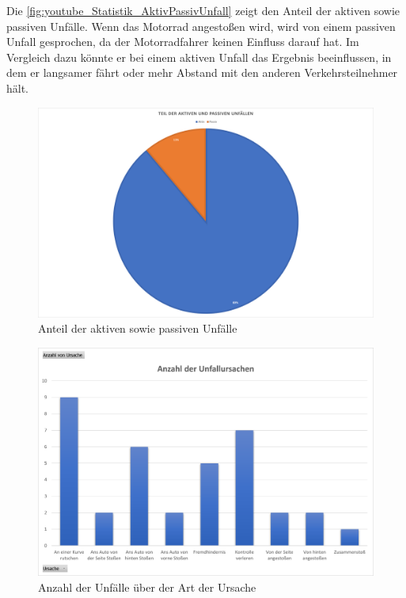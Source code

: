 Die \autoref{fig:youtube_Statistik_AktivPassivUnfall} zeigt den Anteil der aktiven sowie passiven Unfälle. Wenn das Motorrad angestoßen wird, wird von einem passiven Unfall gesprochen, da der Motorradfahrer keinen Einfluss darauf hat. Im Vergleich dazu könnte er bei einem aktiven Unfall das Ergebnis beeinflussen, in dem er langsamer fährt oder mehr Abstand mit den anderen Verkehrsteilnehmer hält.

\begin{figure}
	\centering
	\includegraphics[width=\linewidth]{Bilder/youtube_Statistik_AktivPassivUnfall.png}
	\caption{Anteil der aktiven sowie passiven Unfälle}
	\label{fig:youtube_Statistik_AktivPassivUnfall}
\end{figure}

\begin{figure}
	\centering
	\includegraphics[width=0.9\linewidth]{Bilder/youtube_Statistik_AnzahlUnfallUrsachen.png}
	\caption{Anzahl der Unfälle über der Art der Ursache}
	\label{fig:youtube_Statistik_AnzahlUnfallUrsachen}
\end{figure}


